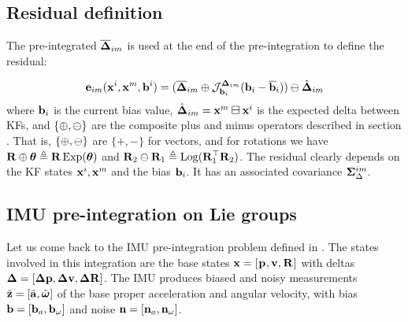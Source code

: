 \subsection{Residual definition}
\label{sec:preint_residual}

The pre-integrated $\overline{{\bm \Delta}}_{im}$ is used at the end of the pre-integration to define the residual:

\begin{align}
    {\bf e}_{im}({\bf x}^i, {\bf x}^m, {\bf b}^i) = (\overline{{\bm \Delta}}_{im} \oplus {\mathcal{J}^{{\bm \Delta}_{im}}_{{\bf b}_i}}({\bf b}_i-\overline{{\bf b}}_i) ) \ominus \hat{{\bm \Delta}}_{im}
    \label{eq:preint_residual}
\end{align}
%
where ${\bf b}_i$ is the current bias value,  $\hat{{\bm \Delta}}_{im}={\bf x}^m\boxminus{\bf x}^i$ is the expected delta between KFs, and $\{\oplus,\ominus\}$ are the composite
 plus and minus operators described in section . 
That is, $\{\oplus,\ominus\}$ are $\{+,-\}$ for vectors, and for rotations we have ${\bf R}\oplus\bm\theta\triangleq{\bf R}\operatorname*{Exp}(\bm\theta)$ and ${\bf R}_2\ominus{\bf R}_1\triangleq\operatorname*{Log}({\bf R}_1^{\top}{\bf R}_2)$. 
The residual clearly depends on the KF states ${\bf x}^i,{\bf x}^m$ and the bias ${\bf b}_i$. It has an associated covariance  ${\bm \Sigma}_\Delta^{im}$.



\subsection{IMU pre-integration on Lie groups}

Let us come back to the IMU pre-integration problem defined in .
The states involved in this integration are the base states ${\bf x} = [\prescript{}{}{{\bf p}}_{}, {\bf v}, \prescript{}{}{{\bf R}}_{}]$ with deltas ${\bm \Delta}=[{\bm \Delta {\bf p}},{\bm \Delta {\bf v}},{\bm \Delta {\bf R}}]$. 
The IMU produces biased and noisy measurements $\tilde{{\bf z}} = [\tilde{{\bf a}}, \tilde{{\bm \omega}}]$ of the base proper acceleration and angular velocity, 
with bias ${\bf b} = [{\bf b}_{a}, {\bf b}_{\omega}]$ and noise ${\bf n} = [{\bf n}_{a}, {\bf n}_{\omega}]$. 

